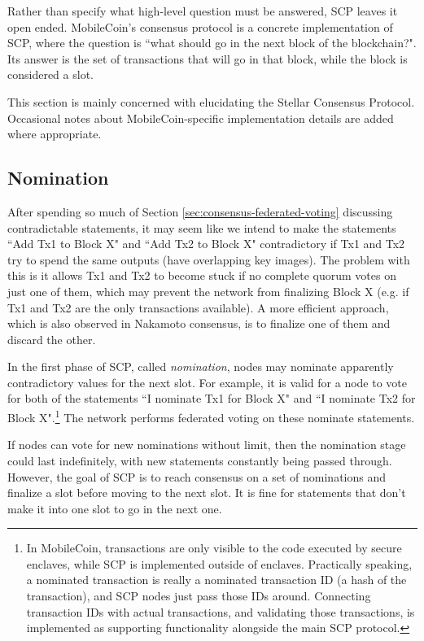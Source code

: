 Rather than specify what high-level question must be answered, SCP leaves it open ended. MobileCoin's consensus protocol is a concrete implementation of SCP, where the question is ``what should go in the next block of the blockchain?". Its answer is the set of transactions that will go in that block, while the block is considered a slot.

This section is mainly concerned with elucidating the Stellar Consensus Protocol. Occasional notes about MobileCoin-specific implementation details are added where appropriate.


\subsection{Nomination}
\label{subsec:consensus-nomination}

After spending so much of Section \ref{sec:consensus-federated-voting} discussing contradictable statements, it may seem like we intend to make the statements ``Add Tx1 to Block X" and ``Add Tx2 to Block X" contradictory if Tx1 and Tx2 try to spend the same outputs (have overlapping key images). The problem with this is it allows Tx1 and Tx2 to become stuck if no complete quorum votes on just one of them, which may prevent the network from finalizing Block X (e.g. if Tx1 and Tx2 are the only transactions available). A more efficient approach, which is also observed in Nakamoto consensus, is to finalize one of them and discard the other.

In the first phase of SCP, called {\em nomination}, nodes may nominate apparently contradictory values for the next slot. For example, it is valid for a node to vote for both of the statements ``I nominate Tx1 for Block X" and ``I nominate Tx2 for Block X".\footnote{In MobileCoin, transactions are only visible to the code executed by secure enclaves, while SCP is implemented outside of enclaves. Practically speaking, a nominated transaction is really a nominated transaction ID (a hash of the transaction), and SCP nodes just pass those IDs around. Connecting transaction IDs with actual transactions, and validating those transactions, is implemented as supporting functionality alongside the main SCP protocol.} The network performs federated voting on these nominate statements.

If nodes can vote for new nominations without limit, then the nomination stage could last indefinitely, with new statements constantly being passed through. However, the goal of SCP is to reach consensus on a set of nominations and finalize a slot before moving to the next slot. It is fine for statements that don't make it into one slot to go in the next one.

